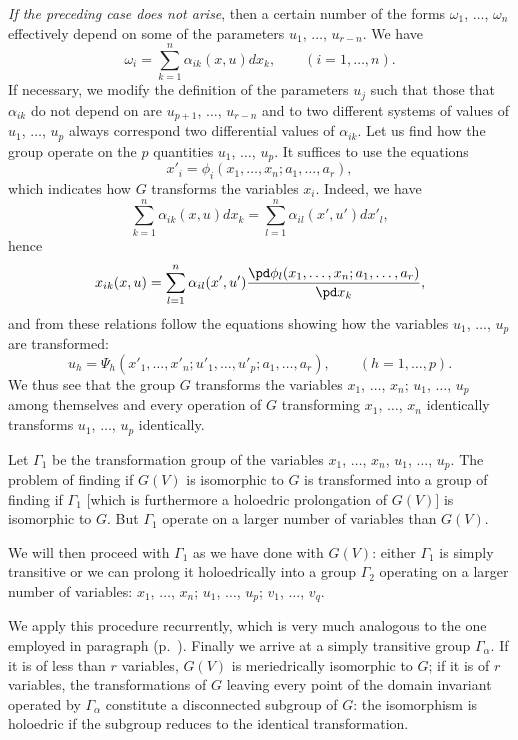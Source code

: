 \emph{If the preceding case does not arise}, then a certain number of the forms $\omega_{1}$, $\dots$, $\omega_{n}$ effectively depend on some of the parameters $u_{1}$, $\dots$, $u_{r-n}$. We have
\[
\omega_{i}=\sum_{k=1}^{n}\alpha_{ik}(x,u)dx_{k},\qquad(i=1,\dots,n).
\]
If necessary, we modify the definition of the parameters $u_{j}$ such that those that $\alpha_{ik}$ do not depend on are $u_{p+1}$, $\dots$, $u_{r-n}$ and to two different systems of values of $u_{1}$, $\dots$, $u_{p}$ always correspond two differential values of $\alpha_{ik}$. Let us find how the group operate on the $p$ quantities $u_{1}$, $\dots$, $u_{p}$. It suffices to use the equations
\begin{equation}
  \label{eq:9.2}
  x'_{i}=\phi_{i}(x_{1},\dots,x_{n};a_{1},\dots,a_{r}),
\end{equation}
which indicates how $G$ transforms the variables $x_{i}$. Indeed, we have
\[
\sum_{k=1}^{n}\alpha_{ik}(x,u)dx_{k}=\sum_{l=1}^{n}\alpha_{il}(x',u')dx'_{l},
\]
hence
\[
x_{ik}(x,u)=\sum_{l=1}^{n}\alpha_{il}(x',u')\frac{\pd \phi_{l}(x_{1},\dots,x_{n};a_{1},\dots,a_{r})}{\pd x_{k}},
\]
and from these relations follow the equations showing how the variables $u_{1}$, $\dots$, $u_{p}$ are transformed:
\begin{equation}
  \label{eq:9.3}
  u_{h}=\Psi_{h}(x'_{1},\dots,x'_{n};u'_{1},\dots,u'_{p};a_{1},\dots,a_{r}),\qquad(h=1,\dots,p).
\end{equation}
We thus see that the group $G$ transforms the variables $x_{1}$, $\dots$, $x_{n}$; $u_1$, $\dots$, $u_{p}$ among themselves and every operation of $G$ transforming $x_{1}$, $\dots$, $x_{n}$ identically transforms $u_{1}$, $\dots$, $u_{p}$ identically.

Let $\Gamma_{1}$ be the transformation group of the variables $x_{1}$, $\dots$, $x_{n}$, $u_{1}$, $\dots$, $u_{p}$. The problem of finding if $G(V)$ is isomorphic to $G$ is transformed into a group of finding if $\Gamma_{1}$ [which is furthermore a holoedric prolongation of $G(V)$] is isomorphic to $G$. But $\Gamma_{1}$ operate on a larger number of variables than $G(V)$.

We will then proceed with $\Gamma_{1}$ as we have done with $G(V)$: either $\Gamma_{1}$ is simply transitive or we can prolong it holoedrically into a group $\Gamma_{2}$ operating on a larger number of variables: $x_{1}$, $\dots$, $x_{n}$; $u_{1}$, $\dots$, $u_{p}$; $v_{1}$, $\dots$, $v_{q}$.

We apply this procedure recurrently, which is very much analogous to the one employed in paragraph  (p.~\pageref{sec:112}). Finally we arrive at a simply transitive group $\Gamma_{\alpha}$. If it is of less than $r$ variables, $G(V)$ is meriedrically isomorphic to $G$; if it is of $r$ variables, the transformations of $G$ leaving every point of the domain invariant operated by $\Gamma_{\alpha}$ constitute a disconnected subgroup of $G$: the isomorphism is holoedric if the subgroup reduces to the identical transformation.

